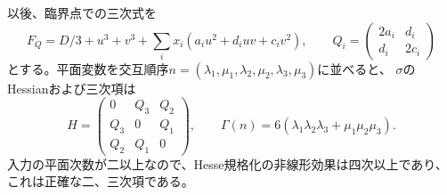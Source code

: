 以後、臨界点での三次式を
\begin{equation}\label{mh:criticalfamily}
 F_Q=D/3+u^3+v^3+\sum_i x_i(a_i u^2+d_iuv+c_i v^2),\qquad
 Q_i=\begin{pmatrix}2a_i&d_i\\d_i&2c_i\end{pmatrix}
\end{equation}
とする。平面変数を交互順序$n=(\lambda_1,\mu_1,\lambda_2,\mu_2,\lambda_3,\mu_3)$に並べると、
$\sigma$のHessianおよび三次項は
\begin{equation}\label{mh:hessian}
 H=\begin{pmatrix}0&Q_3&Q_2\\Q_3&0&Q_1\\Q_2&Q_1&0\end{pmatrix},\qquad
 \Gamma(n)=6(\lambda_1\lambda_2\lambda_3+\mu_1\mu_2\mu_3).
\end{equation}
入力の平面次数が二以上なので、Hesse規格化の非線形効果は四次以上であり、これは正確な二、三次項である。

